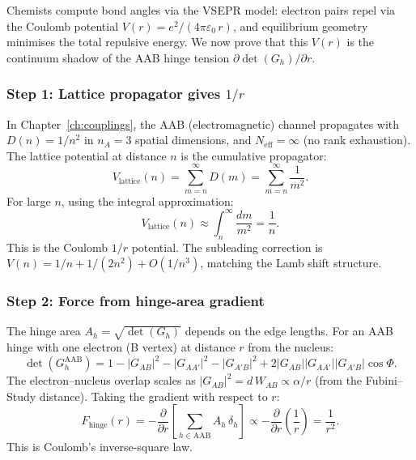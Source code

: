 \documentclass[12pt]{article}
\theoremstyle{remark}
\theoremstyle{definition}
\begin{document}
Chemists compute bond angles via the VSEPR model: electron pairs repel via the Coulomb potential $V(r) = e^2/(4\pi\varepsilon_0\,r)$, and equilibrium geometry minimises the total repulsive energy.  We now prove that this $V(r)$ is the continuum shadow of the AAB hinge tension $\partial\det(G_h)/\partial r$.

\subsubsection{Step 1: Lattice propagator gives $1/r$}

In Chapter~\ref{ch:couplings}, the AAB (electromagnetic) channel propagates with $D(n) = 1/n^2$ in $n_A = 3$ spatial dimensions, and $N_\text{eff} = \infty$ (no rank exhaustion).  The lattice potential at distance $n$ is the cumulative propagator:
\begin{equation}
V_\text{lattice}(n) = \sum_{m=n}^{\infty} D(m) = \sum_{m=n}^{\infty}\frac{1}{m^2}.
\end{equation}
For large $n$, using the integral approximation:
\begin{equation}
V_\text{lattice}(n) \approx \int_n^\infty \frac{dm}{m^2} = \frac{1}{n}.
\end{equation}
This is the Coulomb $1/r$ potential.  The subleading correction is $V(n) = 1/n + 1/(2n^2) + O(1/n^3)$, matching the Lamb shift structure.

\subsubsection{Step 2: Force from hinge-area gradient}

The hinge area $A_h = \sqrt{\det(G_h)}$ depends on the edge lengths.  For an AAB hinge with one electron (B vertex) at distance $r$ from the nucleus:
\begin{equation}
\det(G_h^{\text{AAB}}) = 1 - |G_{AB}|^2 - |G_{AA'}|^2 - |G_{A'B}|^2 + 2|G_{AB}||G_{AA'}||G_{A'B}|\cos\Phi.
\end{equation}
The electron--nucleus overlap scales as $|G_{AB}|^2 = d\,W_{AB} \propto \alpha/r$ (from the Fubini--Study distance).  Taking the gradient with respect to $r$:
\begin{equation}
F_\text{hinge}(r) = -\frac{\partial}{\partial r}\left[\sum_{h \in \text{AAB}} A_h\,\delta_h\right] \propto -\frac{\partial}{\partial r}\left(\frac{1}{r}\right) = \frac{1}{r^2}.
\end{equation}
This is Coulomb's inverse-square law.
\end{document}
